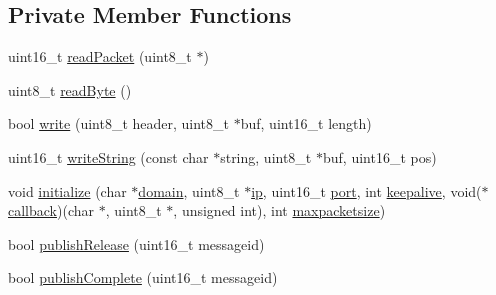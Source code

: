 \subsection*{Private Member Functions}
\begin{DoxyCompactItemize}
\item 
uint16\+\_\+t \hyperlink{class_m_q_t_t_a78d0e70a566c983f13b002b88c467267}{read\+Packet} (uint8\+\_\+t $\ast$)
\item 
uint8\+\_\+t \hyperlink{class_m_q_t_t_aad0854b6a156344e03926ab53f15adbd}{read\+Byte} ()
\item 
bool \hyperlink{class_m_q_t_t_a19b7d1a9fae7e5176469c167a6919060}{write} (uint8\+\_\+t header, uint8\+\_\+t $\ast$buf, uint16\+\_\+t length)
\item 
uint16\+\_\+t \hyperlink{class_m_q_t_t_ae75a977549b28466d0a40cdf90e49c01}{write\+String} (const char $\ast$string, uint8\+\_\+t $\ast$buf, uint16\+\_\+t pos)
\item 
void \hyperlink{class_m_q_t_t_a849de76aa2a1f4b89c1b4a8dfb7c3661}{initialize} (char $\ast$\hyperlink{class_m_q_t_t_a36cef0e2c168c4ce68dda653df6e3be1}{domain}, uint8\+\_\+t $\ast$\hyperlink{class_m_q_t_t_a70618323bb75b467ed054dd191397b37}{ip}, uint16\+\_\+t \hyperlink{class_m_q_t_t_a27559174e21256b6235ff281ba605fe8}{port}, int \hyperlink{class_m_q_t_t_af93aeb459130c36b2a8d894011f10492}{keepalive}, void($\ast$\hyperlink{class_m_q_t_t_ad40d1645b7ec6c7b969883825f0c0469}{callback})(char $\ast$, uint8\+\_\+t $\ast$, unsigned int), int \hyperlink{class_m_q_t_t_aac8cf32807b542ce45a9060d9769f35e}{maxpacketsize})
\item 
bool \hyperlink{class_m_q_t_t_a3ec02b7dbe1fbea9f48ee3fc7cb3a9b8}{publish\+Release} (uint16\+\_\+t messageid)
\item 
bool \hyperlink{class_m_q_t_t_a98364d0b5900925a0466b64b84396b18}{publish\+Complete} (uint16\+\_\+t messageid)
\end{DoxyCompactItemize}
